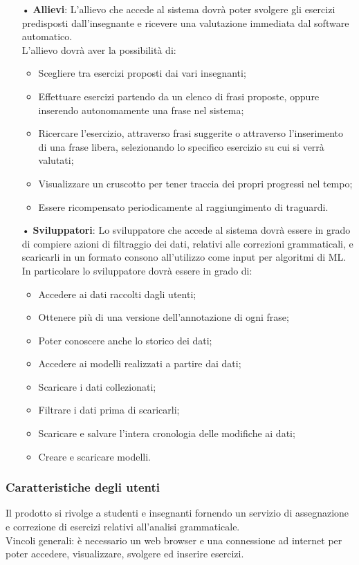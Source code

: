 \begin{itemize}
\item[•]\textbf{Allievi}:
L'allievo che accede al sistema dovrà poter svolgere gli esercizi predisposti dall'insegnante e ricevere una valutazione immediata dal software automatico.\\
L'allievo dovrà aver la possibilità di:
\begin{itemize}
\item Scegliere tra esercizi proposti dai vari insegnanti;
\item Effettuare esercizi partendo da un elenco di frasi proposte, oppure inserendo autonomamente una frase nel sistema;
\item Ricercare l'esercizio, attraverso frasi suggerite o attraverso l'inserimento di una frase libera, selezionando lo specifico esercizio su cui si verrà valutati; 
\item Visualizzare un {cruscotto} per tener traccia dei propri progressi nel tempo;
\item Essere ricompensato periodicamente al raggiungimento di traguardi.
\end{itemize}
\item[•]\textbf{Sviluppatori}:
Lo sviluppatore che accede al sistema dovrà essere in grado di compiere azioni di filtraggio dei dati, relativi alle correzioni grammaticali, e scaricarli in un formato consono all'utilizzo come input per algoritmi di {ML}. \\
In particolare lo sviluppatore dovrà essere in grado di:
\begin{itemize}
\item Accedere ai dati raccolti dagli utenti;
\item Ottenere più di una versione dell'annotazione di ogni frase;
\item Poter conoscere anche lo storico dei dati;
\item Accedere ai modelli realizzati a partire dai dati;
\item Scaricare i dati collezionati;
\item Filtrare i dati prima di scaricarli;
\item Scaricare e salvare l'intera cronologia delle modifiche ai dati;
\item Creare e scaricare modelli.
\end{itemize}
\end{itemize}
\subsubsection{Caratteristiche degli utenti}
Il prodotto si rivolge a studenti e insegnanti fornendo un servizio di assegnazione e correzione di esercizi relativi all'analisi grammaticale. \\ 
Vincoli generali:
è necessario un web browser e una connessione ad internet per poter accedere, visualizzare, svolgere ed inserire esercizi.

